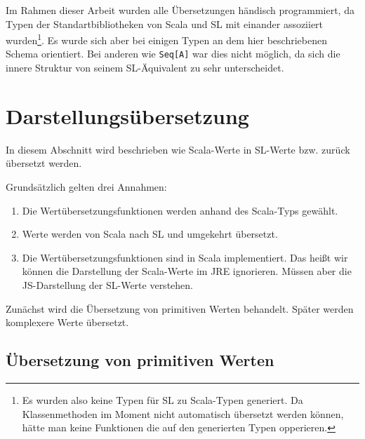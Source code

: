 \documentclass[12pt,bibtotoc]{scrreprt}
\begin{document}
Im Rahmen dieser Arbeit wurden alle Übersetzungen händisch programmiert, da Typen der Standartbibliotheken von Scala und SL mit einander assoziiert wurden\footnote{Es wurden also keine Typen für SL zu Scala-Typen generiert. Da Klassenmethoden im Moment nicht automatisch übersetzt werden können, hätte man keine Funktionen die auf den generierten Typen opperieren.}. Es wurde sich aber bei einigen Typen an dem hier beschriebenen Schema orientiert. Bei anderen wie \lstinline!Seq[A]! war dies nicht möglich, da sich die innere Struktur von seinem SL-Äquivalent zu sehr unterscheidet.


\section{Darstellungsübersetzung}
\label{sec:value-transformation}

In diesem Abschnitt wird beschrieben wie Scala-Werte in SL-Werte bzw. zurück übersetzt werden. 

Grundsätzlich gelten drei Annahmen: 
\begin{enumerate}
 \item Die Wertübersetzungsfunktionen werden anhand des Scala-Typs gewählt.
 \item Werte werden von Scala nach SL und umgekehrt übersetzt.
 \item Die Wertübersetzungsfunktionen sind in Scala implementiert. Das heißt wir können die Darstellung der Scala-Werte im JRE ignorieren. Müssen aber die JS-Darstellung der SL-Werte verstehen.
\end{enumerate}

Zunächst wird die Übersetzung von primitiven Werten behandelt. Später werden komplexere Werte übersetzt.

\subsection{Übersetzung von primitiven Werten}
\label{subsec:primitive-value-translation}
\end{document}
